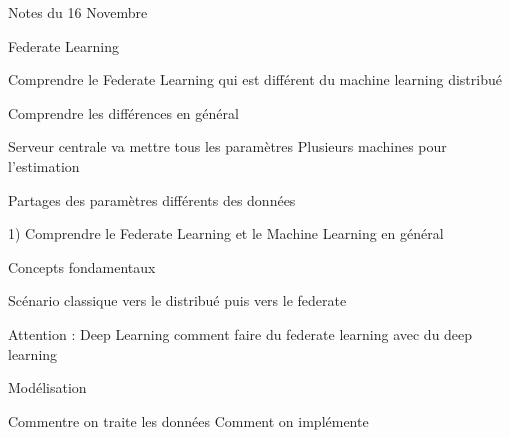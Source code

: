 \documentclass[12pt,a4paper]{article}
\begin{document}
Notes du 16 Novembre

Federate Learning

Comprendre le Federate Learning qui est différent du machine learning distribué 

Comprendre les différences en général

Serveur centrale va mettre tous les paramètres 
Plusieurs machines pour l'estimation

Partages des paramètres différents des données

1) Comprendre le Federate Learning et le Machine Learning en général

Concepts fondamentaux

Scénario classique vers le distribué puis vers le federate

Attention : Deep Learning comment faire du federate learning avec du deep learning

Modélisation

Commentre on traite les données
Comment on implémente
\end{document}
